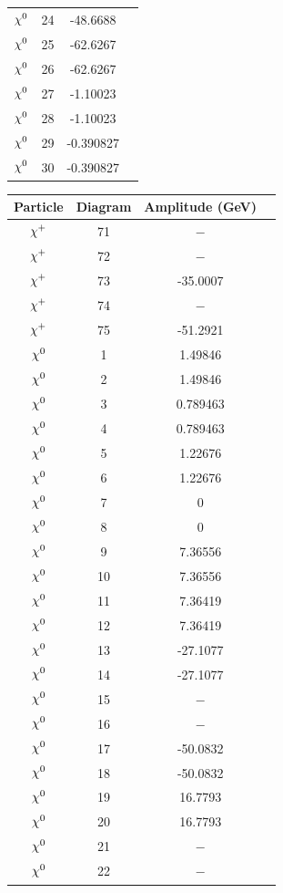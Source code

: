 \documentclass[11pt]{article}
\newcommand{\mychibig}{\raisebox{0pt}[1ex][1ex]{$\chi$}}
\begin{document}
\begin{table}[h!]
\begin{tabular}{c c c c}
$\mychibig^0$ & 24 & -48.6688 \\ 
$\mychibig^0$ & 25 & -62.6267 \\ 
$\mychibig^0$ & 26 & -62.6267 \\ 
$\mychibig^0$ & 27 & -1.10023 \\ 
$\mychibig^0$ & 28 & -1.10023 \\ 
$\mychibig^0$ & 29 & -0.390827 \\ 
$\mychibig^0$ & 30 & -0.390827 \\ 
\hline\end{tabular}
\begin{tabular}{c c c c}
Particle & Diagram & Amplitude (GeV) \\
\hline
$\mychibig^+$ & 71 & $-$ \\ 
$\mychibig^+$ & 72 & $-$ \\ 
$\mychibig^+$ & 73 & -35.0007 \\ 
$\mychibig^+$ & 74 & $-$ \\ 
$\mychibig^+$ & 75 & -51.2921 \\ 
$\mychibig^0$ & 1 & 1.49846 \\ 
$\mychibig^0$ & 2 & 1.49846 \\ 
$\mychibig^0$ & 3 & 0.789463 \\ 
$\mychibig^0$ & 4 & 0.789463 \\ 
$\mychibig^0$ & 5 & 1.22676 \\ 
$\mychibig^0$ & 6 & 1.22676 \\ 
$\mychibig^0$ & 7 & 0 \\ 
$\mychibig^0$ & 8 & 0 \\ 
$\mychibig^0$ & 9 & 7.36556 \\ 
$\mychibig^0$ & 10 & 7.36556 \\ 
$\mychibig^0$ & 11 & 7.36419 \\ 
$\mychibig^0$ & 12 & 7.36419 \\ 
$\mychibig^0$ & 13 & -27.1077 \\ 
$\mychibig^0$ & 14 & -27.1077 \\ 
$\mychibig^0$ & 15 & $-$ \\ 
$\mychibig^0$ & 16 & $-$ \\ 
$\mychibig^0$ & 17 & -50.0832 \\ 
$\mychibig^0$ & 18 & -50.0832 \\ 
$\mychibig^0$ & 19 & 16.7793 \\ 
$\mychibig^0$ & 20 & 16.7793 \\ 
$\mychibig^0$ & 21 & $-$ \\ 
$\mychibig^0$ & 22 & $-$ \\ 

\end{tabular}
\end{table}
\end{document}
